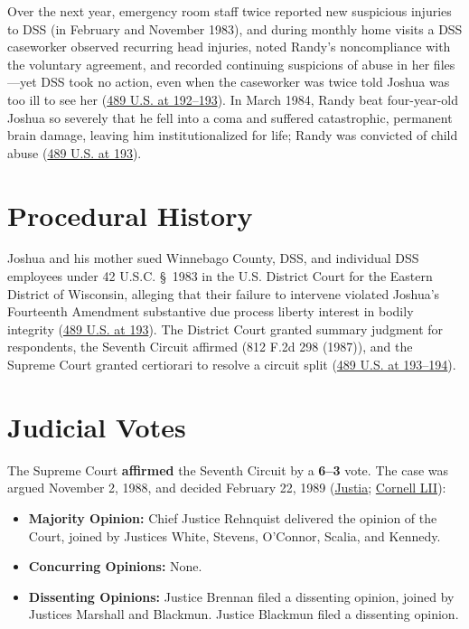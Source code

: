 \documentclass[12pt]{article}
\begin{document}
Over the next year, emergency room staff twice reported new suspicious injuries to DSS (in February and November 1983), and during monthly home visits a DSS caseworker observed recurring head injuries, noted Randy's noncompliance with the voluntary agreement, and recorded continuing suspicions of abuse in her files---yet DSS took no action, even when the caseworker was twice told Joshua was too ill to see her (\href{https://supreme.justia.com/cases/federal/us/489/189/}{489 U.S. at 192--193}). In March 1984, Randy beat four-year-old Joshua so severely that he fell into a coma and suffered catastrophic, permanent brain damage, leaving him institutionalized for life; Randy was convicted of child abuse (\href{https://supreme.justia.com/cases/federal/us/489/189/}{489 U.S. at 193}).

\section{Procedural History}
Joshua and his mother sued Winnebago County, DSS, and individual DSS employees under 42 U.S.C. \S~1983 in the U.S. District Court for the Eastern District of Wisconsin, alleging that their failure to intervene violated Joshua's Fourteenth Amendment substantive due process liberty interest in bodily integrity (\href{https://supreme.justia.com/cases/federal/us/489/189/}{489 U.S. at 193}). The District Court granted summary judgment for respondents, the Seventh Circuit affirmed (812 F.2d 298 (1987)), and the Supreme Court granted certiorari to resolve a circuit split (\href{https://supreme.justia.com/cases/federal/us/489/189/}{489 U.S. at 193--194}).

\section{Judicial Votes}
The Supreme Court \textbf{affirmed} the Seventh Circuit by a \textbf{6--3} vote. The case was argued November 2, 1988, and decided February 22, 1989 (\href{https://supreme.justia.com/cases/federal/us/489/189/}{Justia}; \href{https://www.law.cornell.edu/supremecourt/text/489/189}{Cornell LII}):

\begin{itemize}
    \item \textbf{Majority Opinion:} Chief Justice Rehnquist delivered the opinion of the Court, joined by Justices White, Stevens, O'Connor, Scalia, and Kennedy.
    \item \textbf{Concurring Opinions:} None.
    \item \textbf{Dissenting Opinions:} Justice Brennan filed a dissenting opinion, joined by Justices Marshall and Blackmun. Justice Blackmun filed a dissenting opinion.
\end{itemize}
\end{document}
